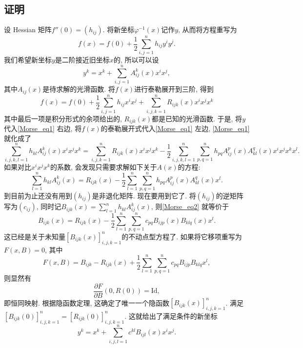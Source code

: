 \subsection{证明}
设 Hessian 矩阵$f''(0)=(h_{ij})$. 将新坐标$\varphi^{-1}(x)$记作$y$, 从而将方程重写为
\begin{equation}\label{Morse_eq1}
f(x)=f(0)+\frac{1}{2}\sum_{i,j=1}^nh_{ij}y^iy^j.
\end{equation}
我们希望新坐标$y$是二阶接近旧坐标$x$的, 所以可以设
$$
y^k
=x^k+\sum_{i,j=1}^nA^k_{ij}(x)x^ix^j,
$$
其中$A_{ij}(x)$是待求解的光滑函数. 将$f(x)$进行泰勒展开到三阶, 得到
$$
f(x)=f(0)+\frac{1}{2}\sum_{i,j=1}^nh_{ij}x^ix^j+
\sum_{i,j,k=1}^nR_{ijk}(x)x^ix^jx^k
$$
其中最后一项是积分形式的余项给出的, $R_{ijk}(x)$都是已知的光滑函数. 于是, 将$y$代入\autoref{Morse_eq1} 右边, 将$f(x)$的泰勒展开式代入\autoref{Morse_eq1} 左边, \autoref{Morse_eq1} 就化成了
$$
\sum_{i,j,k,l=1}^nh_{kl}A^k_{ij}(x)x^ix^jx^k
=\sum_{i,j,k=1}^nR_{ijk}(x)x^ix^jx^k
-\frac{1}{2}\sum_{i,j,k,l=1}^n\sum_{p,q=1}^nh_{pq}A^p_{ij}(x)A^q_{kl}(x)x^ix^jx^kx^l.
$$
如果对比$x^ix^jx^k$的系数, 会发现只需要求解如下关于$A(x)$的方程:
\begin{equation}\label{Morse_eq2}
\sum_{l=1}^nh_{kl}A^k_{ij}(x)
=R_{ijk}(x)
-\frac{1}{2}\sum_{l=1}^n\sum_{p,q=1}^nh_{pq}A^p_{ij}(x)A^q_{kl}(x)x^l.
\end{equation}
到目前为止还没有用到$(h_{ij})$是非退化矩阵. 现在要用到它了. 将$(h_{ij})$的逆矩阵写为$(c_{ij})$, 同时记$B_{ijk}(x)=\sum_{l=1}^nh_{kl}A^k_{ij}(x)$, 则\autoref{Morse_eq2} 就等价于
$$
B_{ijk}(x)
=R_{ijk}(x)-\frac{1}{2}\sum_{l=1}^n\sum_{p,q=1}^nc_{pq}B_{ijp}(x)B_{klq}(x)x^l.
$$
这已经是关于未知量$[B_{ijk}(x)]_{i,j,k=1}^n$的不动点型方程了. 如果将它移项重写为$F(x,B)=0$, 其中
$$
F(x,B)=B_{ijk}-R_{ijk}(x)+\frac{1}{2}\sum_{l=1}^n\sum_{p,q=1}^nc_{pq}B_{ijp}B_{klq}x^l,
$$
则显然有
$$
\frac{\partial F}{\partial B}(0,R(0))=\mathrm{Id},
$$
即恒同映射. 根据隐函数定理, 这确定了唯一一个隐函数$[B_{ijk}(x)]_{i,j,k=1}^n$. 满足$[B_{ijk}(0)]_{i,j,k=1}^n=[R_{ijk}(0)]_{i,j,k=1}^n$. 这就给出了满足条件的新坐标
$$
y^k
=x^k+\sum_{i,j,l=1}^nc^{kl}B_{ijl}(x)x^ix^j.
$$ 